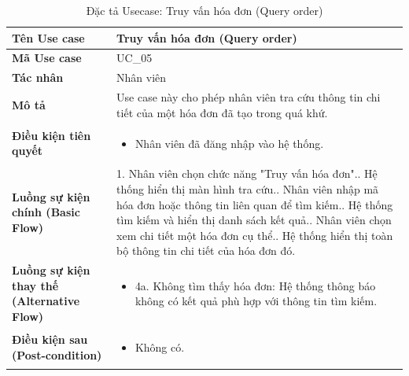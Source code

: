 \documentclass[12pt,a4paper]{report}
\begin{document}
\begin{longtable}{|>{\raggedright\arraybackslash\bfseries}p{4.5cm}|p{11cm}|}
\caption{Đặc tả Usecase: Truy vấn hóa đơn (Query order)} \label{tab:uc_query_order} \\
\hline
Tên Use case & Truy vấn hóa đơn (Query order) \\ \hline
Mã Use case & UC\_05 \\ \hline
Tác nhân & Nhân viên \\ \hline
Mô tả & Use case này cho phép nhân viên tra cứu thông tin chi tiết của một hóa đơn đã tạo trong quá khứ. \\ \hline
Điều kiện tiên quyết & 
\begin{itemize}[leftmargin=*, nosep, topsep=0pt, partopsep=0pt]
    \item Nhân viên đã đăng nhập vào hệ thống.
\end{itemize} \\ \hline
Luồng sự kiện chính (Basic Flow) & 
1. Nhân viên chọn chức năng "Truy vấn hóa đơn".\newline
2. Hệ thống hiển thị màn hình tra cứu.\newline
3. Nhân viên nhập mã hóa đơn hoặc thông tin liên quan để tìm kiếm.\newline
4. Hệ thống tìm kiếm và hiển thị danh sách kết quả.\newline
5. Nhân viên chọn xem chi tiết một hóa đơn cụ thể.\newline
6. Hệ thống hiển thị toàn bộ thông tin chi tiết của hóa đơn đó. \\ \hline
Luồng sự kiện thay thế (Alternative Flow) & 
\begin{itemize}[leftmargin=*, nosep, topsep=0pt, partopsep=0pt]
    \item 4a. Không tìm thấy hóa đơn: Hệ thống thông báo không có kết quả phù hợp với thông tin tìm kiếm.
\end{itemize} \\ \hline
Điều kiện sau (Post-condition) & 
\begin{itemize}[leftmargin=*, nosep, topsep=0pt, partopsep=0pt]
    \item Không có.
\end{itemize} \\ \hline
\end{longtable}
\end{document}
